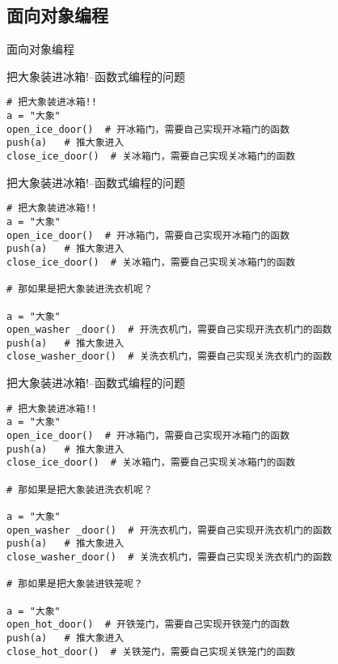 \subsection{面向对象编程}
\begin{frame}[standout] 面向对象编程 \end{frame}

\begin{frame}[fragile]{把大象装进冰箱!--函数式编程的问题}
    \begin{lstlisting}
# 把大象装进冰箱!!
a = "大象"
open_ice_door()  # 开冰箱门，需要自己实现开冰箱门的函数
push(a)   # 推大象进入
close_ice_door()  # 关冰箱门，需要自己实现关冰箱门的函数
    \end{lstlisting}
\end{frame}

\begin{frame}[fragile]{把大象装进冰箱!--函数式编程的问题}
    \begin{lstlisting}
# 把大象装进冰箱!!
a = "大象"
open_ice_door()  # 开冰箱门，需要自己实现开冰箱门的函数
push(a)   # 推大象进入
close_ice_door()  # 关冰箱门，需要自己实现关冰箱门的函数

# 那如果是把大象装进洗衣机呢？

a = "大象"
open_washer _door()  # 开洗衣机门，需要自己实现开洗衣机门的函数
push(a)   # 推大象进入
close_washer_door()  # 关洗衣机门，需要自己实现关洗衣机门的函数
    \end{lstlisting}
\end{frame}

\begin{frame}[fragile]{把大象装进冰箱!--函数式编程的问题}
    \begin{lstlisting}
# 把大象装进冰箱!!
a = "大象"
open_ice_door()  # 开冰箱门，需要自己实现开冰箱门的函数
push(a)   # 推大象进入
close_ice_door()  # 关冰箱门，需要自己实现关冰箱门的函数

# 那如果是把大象装进洗衣机呢？

a = "大象"
open_washer _door()  # 开洗衣机门，需要自己实现开洗衣机门的函数
push(a)   # 推大象进入
close_washer_door()  # 关洗衣机门，需要自己实现关洗衣机门的函数

# 那如果是把大象装进铁笼呢？

a = "大象"
open_hot_door()  # 开铁笼门，需要自己实现开铁笼门的函数
push(a)   # 推大象进入
close_hot_door()  # 关铁笼门，需要自己实现关铁笼门的函数
    \end{lstlisting}
\end{frame}

